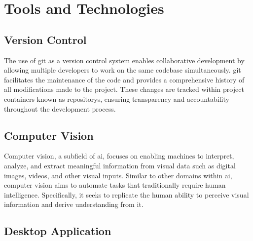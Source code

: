 

\section{Tools and Technologies}

\subsection{Version Control}

The use of \gls{git} as a version control system enables collaborative development by allowing multiple developers to work on the same codebase simultaneously. \gls{git} facilitates the maintenance of the code and provides a comprehensive history of all modifications made to the project. These changes are tracked within project containers known as \glspl{repository}, ensuring transparency and accountability throughout the development process. \cite{alphaefficiency:git}

\subsection{Computer Vision}

Computer vision, a subfield of \gls{ai}, focuses on enabling machines to interpret, analyze, and extract meaningful information from visual data such as digital images, videos, and other visual inputs. \cite{google:vision} Similar to other domains within \gls{ai}, computer vision aims to automate tasks that traditionally require human intelligence. Specifically, it seeks to replicate the human ability to perceive visual information and derive understanding from it. \cite{microsoft:vision}

\subsection{Desktop Application}

